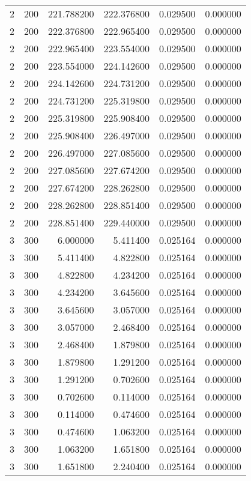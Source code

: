 \begin{longtable}{rrrrrr}
2 & 200 & 221.788200 & 222.376800 & 0.029500 & 0.000000 \\
2 & 200 & 222.376800 & 222.965400 & 0.029500 & 0.000000 \\
2 & 200 & 222.965400 & 223.554000 & 0.029500 & 0.000000 \\
2 & 200 & 223.554000 & 224.142600 & 0.029500 & 0.000000 \\
2 & 200 & 224.142600 & 224.731200 & 0.029500 & 0.000000 \\
2 & 200 & 224.731200 & 225.319800 & 0.029500 & 0.000000 \\
2 & 200 & 225.319800 & 225.908400 & 0.029500 & 0.000000 \\
2 & 200 & 225.908400 & 226.497000 & 0.029500 & 0.000000 \\
2 & 200 & 226.497000 & 227.085600 & 0.029500 & 0.000000 \\
2 & 200 & 227.085600 & 227.674200 & 0.029500 & 0.000000 \\
2 & 200 & 227.674200 & 228.262800 & 0.029500 & 0.000000 \\
2 & 200 & 228.262800 & 228.851400 & 0.029500 & 0.000000 \\
2 & 200 & 228.851400 & 229.440000 & 0.029500 & 0.000000 \\
3 & 300 & 6.000000 & 5.411400 & 0.025164 & 0.000000 \\
3 & 300 & 5.411400 & 4.822800 & 0.025164 & 0.000000 \\
3 & 300 & 4.822800 & 4.234200 & 0.025164 & 0.000000 \\
3 & 300 & 4.234200 & 3.645600 & 0.025164 & 0.000000 \\
3 & 300 & 3.645600 & 3.057000 & 0.025164 & 0.000000 \\
3 & 300 & 3.057000 & 2.468400 & 0.025164 & 0.000000 \\
3 & 300 & 2.468400 & 1.879800 & 0.025164 & 0.000000 \\
3 & 300 & 1.879800 & 1.291200 & 0.025164 & 0.000000 \\
3 & 300 & 1.291200 & 0.702600 & 0.025164 & 0.000000 \\
3 & 300 & 0.702600 & 0.114000 & 0.025164 & 0.000000 \\
3 & 300 & 0.114000 & 0.474600 & 0.025164 & 0.000000 \\
3 & 300 & 0.474600 & 1.063200 & 0.025164 & 0.000000 \\
3 & 300 & 1.063200 & 1.651800 & 0.025164 & 0.000000 \\
3 & 300 & 1.651800 & 2.240400 & 0.025164 & 0.000000 \\

\end{longtable}

